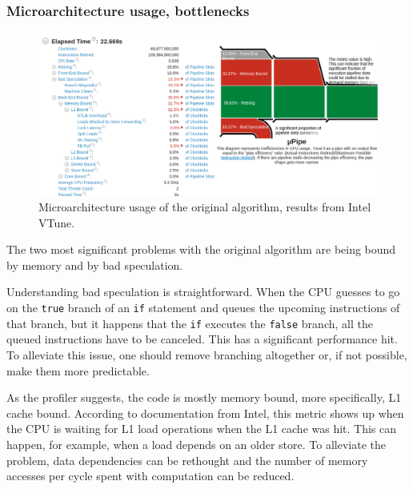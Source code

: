 \documentclass[12pt]{article}
\newcommand{\code}[1]{\texttt{#1}}
\begin{document}
\subsubsection{Microarchitecture usage, bottlenecks}

\begin{figure}[H]
	\begin{center}
		\includegraphics[width=\textwidth]{velout_uarch_overall_orig}
	\end{center}
	\caption{Microarchitecture usage of the original algorithm, results from Intel VTune.}
	\label{fig_velout_uarch_overall_orig}
\end{figure}

The two most significant problems with the original algorithm are being bound by memory and by bad speculation.

Understanding bad speculation is straightforward. When the CPU guesses to go on the \code{true} branch of an \code{if} statement and queues the upcoming instructions of that branch, but it happens that the \code{if} executes the \code{false} branch, all the queued instructions have to be canceled.\cite{intel_vtune_docs} This has a significant performance hit. To alleviate this issue, one should remove branching altogether or, if not possible, make them more predictable.

As the profiler suggests, the code is mostly memory bound, more specifically, L1 cache bound. According to documentation from Intel, this metric shows up when the CPU is waiting for L1 load operations when the L1 cache was hit. This can happen, for example, when a load depends on an older store. To alleviate the problem, data dependencies can be rethought and the number of memory accesses per cycle spent with computation can be reduced.\cite{intel_vtune_docs}
\end{document}
